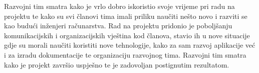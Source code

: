 		{Razvojni tim smatra kako je vrlo dobro iskoristio svoje vrijeme pri radu na projektu te kako su svi članovi tima imali priliku naučiti nešto novo i razviti se kao budući inženjeri računarstva. Rad na projektu pridonio je poboljšanju komunikacijskih i organizacijskih vještina kod članova, stavio ih u nove situacije gdje su morali naučiti koristiti nove tehnologije, kako za sam razvoj aplikacije već i za izradu dokumentacije te organizaciju razvojnog tima. Razvojni tim smatra kako je projekt završio uspješno te je zadovoljan postignutim rezultatom.}
		
		\eject 